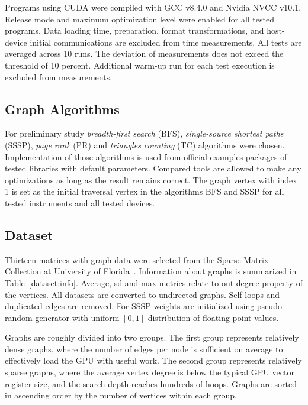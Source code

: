 Programs using CUDA were compiled with GCC v8.4.0 and Nvidia NVCC v10.1.
Release mode and maximum optimization level were enabled for all tested programs. 
Data loading time, preparation, format transformations, and host-device initial communications are excluded from time measurements. 
All tests are averaged across 10 runs. The deviation of measurements does not exceed the threshold of 10 percent. Additional warm-up run for each test execution is excluded from measurements.

\subsection{Graph Algorithms}

For preliminary study \textit{breadth-first search} (BFS), \textit{single-source shortest paths} (SSSP), \textit{page rank} (PR) and \textit{triangles counting} (TC) algorithms were chosen.
Implementation of those algorithms is used from official examples packages of tested libraries with default parameters. Compared tools are allowed to make any optimizations as long as the result remains correct.
The graph vertex with index 1 is set as the initial traversal vertex in the algorithms BFS and SSSP for all tested instruments and all tested devices.

\subsection{Dataset}

Thirteen matrices with graph data were selected from the Sparse Matrix Collection at University of Florida~\cite{dataset:10.1145/2049662.2049663}. 
Information about graphs is summarized in Table~\ref{dataset:info}.
Average, sd and max metrics relate to out degree property of the vertices. 
All datasets are converted to undirected graphs. 
Self-loops and duplicated edges are removed. For SSSP weights are initialized using pseudo-random generator with uniform $[0, 1]$ distribution of floating-point values.

Graphs are roughly divided into two groups. 
The first group represents relatively dense graphs, where the number of edges per node is sufficient on average to effectively load the GPU with useful work. 
The second group represents relatively sparse graphs, where the average vertex degree is below the typical GPU vector register size, and the search depth reaches hundreds of hoops. 
Graphs are sorted in ascending order by the number of vertices within each group.

